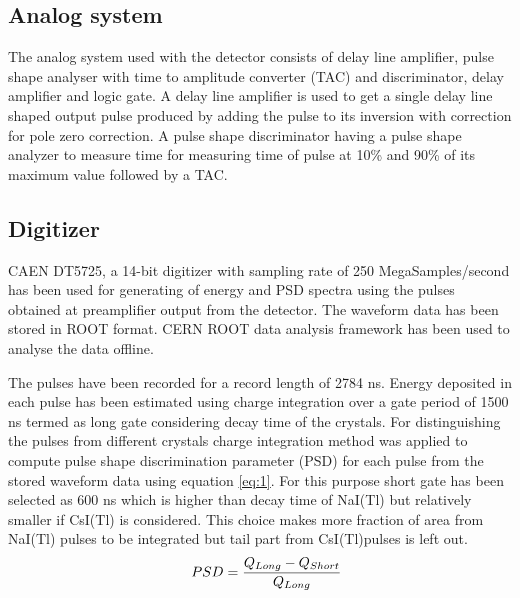 \documentclass[10pt]{article}
\begin{document}
\subsection*{Analog system}
The analog system used with the detector consists of delay line amplifier, pulse shape analyser with time to amplitude converter (TAC) and discriminator, delay amplifier and logic gate. A delay line amplifier is used to get a single delay line shaped output pulse produced by adding the pulse to its inversion with correction for pole zero correction. A pulse shape discriminator having a pulse shape analyzer to measure time for measuring time of pulse at 10\% and 90\% of its maximum value followed by a TAC. 

\subsection*{Digitizer} CAEN DT5725, a 14-bit digitizer with sampling rate of 250 MegaSamples/second has been used for generating of energy and PSD spectra using the pulses obtained at preamplifier output from the detector. The waveform data has been stored in ROOT format. CERN ROOT data analysis framework \cite{brun1997root}has been used to analyse the data offline.  

The pulses have been recorded for a record length of 2784 ns. Energy deposited in each pulse has been estimated using charge integration over a gate period of 1500 ns termed as long gate considering decay time of the crystals. For distinguishing the pulses from different crystals charge integration method was applied to compute pulse shape discrimination parameter (PSD) for each pulse from the stored waveform data using equation \ref{eq:1}. For this purpose short gate has been selected as 600 ns which is higher than decay time of NaI(Tl) but relatively smaller if CsI(Tl) is considered. This choice makes more fraction of area from NaI(Tl) pulses to be integrated but tail part from CsI(Tl)pulses is left out.  
\begin{equation}\label{eq:1}
    \centering \quad PSD =  \dfrac{Q_{Long}-Q_{Short}}{Q_{Long}}
\end{equation}
\end{document}
